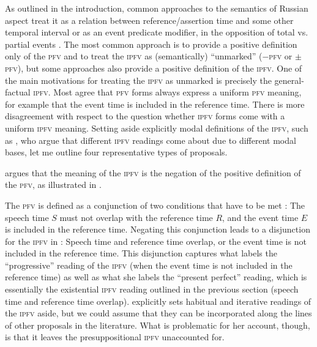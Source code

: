 \documentclass[output=paper]{langscibook}
\begin{document}
As outlined in the introduction, common approaches to the semantics of Russian aspect treat it as a relation between reference/assertion time and some other temporal interval \citep[e.g.][]{klein95, schoorlemmer95, borik02, paslawskastechow, gronndiss, gronn15, ramchandlingua, tatevosov11, tatevosov15} or as an event predicate modifier, in the opposition of total vs. partial events \citep[e.g.][]{filip99,altshuler14}. The most common approach is to provide a positive definition only of the \textsc{pfv} and to treat the \textsc{ipfv} as (semantically) ``unmarked'' ($-$\textsc{pfv} or $\pm$\textsc{pfv}), but some approaches also provide a positive definition of the \textsc{ipfv}. One of the main motivations for treating the \textsc{ipfv} as unmarked is precisely the general-factual \textsc{ipfv}. Most agree that \textsc{pfv} forms always express a uniform \textsc{pfv} meaning, for example that the event time is included in the reference time. There is more disagreement with respect to the question whether \textsc{ipfv} forms come with a uniform \textsc{ipfv} meaning. Setting aside explicitly modal definitions of the \textsc{ipfv}, such as \citet{arregui+14}, who argue that different \textsc{ipfv} readings come about due to different modal bases, let me outline four representative types of proposals. 

\citet{borik02} argues that the meaning of the \textsc{ipfv} is the negation of the positive definition of the \textsc{pfv}, as illustrated in .  

\ea\label{gehr:ex:borikPFIPF} 
\label{gehr:ex:borikPF}
\label{gehr:ex:borikIPF}
\z	
\z

\noindent The \textsc{pfv} is defined as a conjunction of two conditions that have to be met : The speech time $S$ must not overlap with the reference time $R$, and the event time $E$ is included in the reference time. Negating this conjunction leads to a disjunction for the \textsc{ipfv} in : Speech time and reference time overlap, or the event time is not included in the reference time. This disjunction captures what \citeauthor{borik02} labels the ``progressive'' reading of the \textsc{ipfv} (when the event time is not included in the reference time) as well as what she labels the ``present perfect'' reading, which is essentially the existential \textsc{ipfv} reading outlined in the previous section (speech time and reference time overlap). \citeauthor{borik02} explicitly sets habitual and iterative rea\-dings of the \textsc{ipfv} aside, but we could assume that they can be incorporated along the lines of other proposals in the literature. What is problematic for her account, though, is that it leaves the presuppositional \textsc{ipfv} unaccounted for.   
\end{document}

